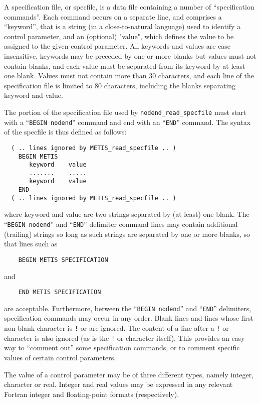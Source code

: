 \documentclass{galahad}
\newcommand{\packagename}{nodend}
\begin{document}
\begin{description}
A specification file, or specfile, is a data file containing a number of
``specification commands''. Each command occurs on a separate line,
and comprises a ``keyword'',
that is a string (in a close-to-natural language) used to identify a
control parameter, and
an (optional) "value", which defines the value to be assigned to the given
control parameter. All keywords and values are case insensitive,
keywords may be preceded by one or more blanks but
values must not contain blanks, and
each value must be separated from its keyword by at least one blank.
Values must not contain more than 30 characters, and
each line of the specification file is limited to 80 characters,
including the blanks separating keyword and value.

The portion of the specification file used by
{\tt \packagename\_read\_specfile}
must start
with a ``{\tt BEGIN \packagename}'' command and end with an
``{\tt END}'' command.  The syntax of the specfile is thus defined as follows:
\begin{verbatim}
  ( .. lines ignored by METIS_read_specfile .. )
    BEGIN METIS
       keyword    value
       .......    .....
       keyword    value
    END
  ( .. lines ignored by METIS_read_specfile .. )
\end{verbatim}
where keyword and value are two strings separated by (at least) one blank.
The ``{\tt BEGIN \packagename}'' and ``{\tt END}'' delimiter command lines
may contain additional (trailing) strings so long as such strings are
separated by one or more blanks, so that lines such as
\begin{verbatim}
    BEGIN METIS SPECIFICATION
\end{verbatim}
and
\begin{verbatim}
    END METIS SPECIFICATION
\end{verbatim}
are acceptable. Furthermore,
between the
``{\tt BEGIN \packagename}'' and ``{\tt END}'' delimiters,
specification commands may occur in any order.  Blank lines and
lines whose first non-blank character is {\tt !} or {\tt *} are ignored.
The content
of a line after a {\tt !} or {\tt *} character is also
ignored (as is the {\tt !} or {\tt *}
character itself). This provides an easy way to ``comment out'' some
specification commands, or to comment specific values
of certain control parameters.

The value of a control parameter may be of three different types, namely
integer, character or real.
Integer and real values may be expressed in any relevant Fortran integer and
floating-point formats (respectively).


\end{description}
\end{document}
